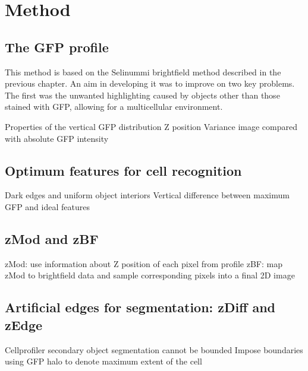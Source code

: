 
\chapter{Method}

\ifpdf
    \graphicspath{{Chapter4/Figs/Raster/}{Chapter4/Figs/PDF/}{Chapter4/Figs/}}
\else
    \graphicspath{{Chapter4/Figs/Vector/}{Chapter4/Figs/}}
\fi

\section{The GFP profile}

This method is based on the Selinummi brightfield method described in the previous chapter. An aim in developing it was to improve on two key problems. The first was the unwanted highlighting caused by objects other than those stained with GFP, allowing for a multicellular environment.

Properties of the vertical GFP distribution
Z position
Variance image compared with absolute GFP intensity

\section{Optimum features for cell recognition}

Dark edges and uniform object interiors
Vertical difference between maximum GFP and ideal features

\section{zMod and zBF}

zMod: use information about Z position of each pixel from profile
zBF: map zMod to brightfield data and sample corresponding pixels into a final 2D image

\section{Artificial edges for segmentation: zDiff and zEdge}

Cellprofiler secondary object segmentation cannot be bounded
Impose boundaries using GFP halo to denote maximum extent of the cell
